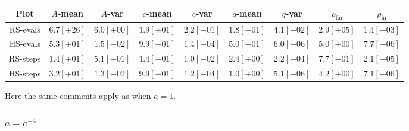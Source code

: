 \begin{table}[H]
    \centering
    \small
    \begin{tabular}{c||c|c|c|c|c|c|c|c}
Plot & \(A\)-mean & \(A\)-var & \(c\)-mean & \(c\)-var & \(q\)-mean & \(q\)-var & \(\rho_{\operatorname{lin}}\) & \(\rho_{\ln}\)\\\hline
\rowcolor{red}
RS-evals & \(6.7[+26]\) & \(6.0[+00]\) & \(1.9[+01]\) & \(2.2[-01]\) & \(1.8[-01]\) & \(4.1[-02]\) & \(2.9[+05]\) & \(1.4[-03]\) \\
\rowcolor{green}
HS-evals & \(5.3[+01]\) & \(1.5[-02]\) & \(9.9[-01]\) & \(1.4[-04]\) & \(5.0[-01]\) & \(6.0[-06]\) & \(5.0[+00]\) & \(7.7[-06]\) \\
\rowcolor{green}
RS-steps & \(1.4[+01]\) & \(5.1[-01]\) & \(1.4[-01]\) & \(1.0[-02]\) & \(2.4[+00]\) & \(2.2[-04]\) & \(7.7[-01]\) & \(2.1[-05]\) \\
\rowcolor{green}
HS-steps & \(3.2[+01]\) & \(1.3[-02]\) & \(9.9[-01]\) & \(1.2[-04]\) & \(1.0[+00]\) & \(5.1[-06]\) & \(4.2[+00]\) & \(7.1[-06]\) \\
    \end{tabular}
    \label{tab:my_label}
\end{table}

Here the same comments apply as when \(a = 1\).

\subsubsection{\(a = e^{-4}\)}

